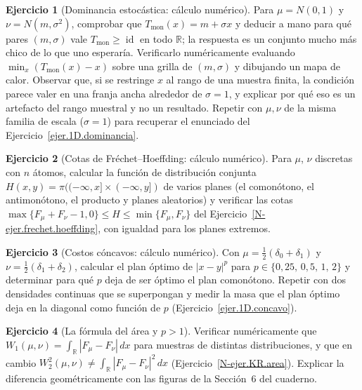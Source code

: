 \documentclass[11pt,a4paper]{amsart}
\newcounter{chapter}
\newcommand{\id}{\operatorname{id}}
\newcommand{\R}{{\mathbb R}}
\theoremstyle{remark}
\theoremstyle{definition}
\newtheorem{ejercicio}{Ejercicio}[chapter]
\numberwithin{subsection}{section}
\numberwithin{equation}{section}
\begin{document}
\begin{ejercicio}[Dominancia estocástica: cálculo numérico]\label{ejc.1D.dominancia}
Para $\mu=N(0,1)$ y $\nu=N(m,\sigma^2)$, comprobar que
$T_{\mathrm{mon}}(x)=m+\sigma x$ y deducir a mano para qué pares
$(m,\sigma)$ vale $T_{\mathrm{mon}}\ge\id$ en todo $\R$; la respuesta es un
conjunto mucho más chico de lo que uno esperaría. Verificarlo numéricamente
evaluando $\min_x(T_{\mathrm{mon}}(x)-x)$ sobre una grilla de $(m,\sigma)$ y
dibujando un mapa de calor. Observar que, si se restringe $x$ al rango de una
muestra finita, la condición parece valer en una franja ancha alrededor de
$\sigma=1$, y explicar por qué eso es un artefacto del rango muestral y no un
resultado. Repetir con $\mu,\nu$ de la misma familia de escala ($\sigma=1$)
para recuperar el enunciado del Ejercicio~\ref{ejer.1D.dominancia}.
\end{ejercicio}

\begin{ejercicio}[Cotas de Fréchet--Hoeffding: cálculo numérico]\label{ejc.1D.frechet}
Para $\mu$, $\nu$ discretas con $n$ átomos, calcular la función de
distribución conjunta $H(x,y)=\pi((-\infty,x]\times(-\infty,y])$ de varios
planes (el comonótono, el antimonótono, el producto y planes aleatorios) y
verificar las cotas $\max\{F_\mu+F_\nu-1,0\}\le H\le\min\{F_\mu,F_\nu\}$ del
Ejercicio~\ref{N-ejer.frechet.hoeffding}, con igualdad para los planes extremos.
\end{ejercicio}

\begin{ejercicio}[Costos cóncavos: cálculo numérico]\label{ejc.1D.concavos}
Con $\mu=\frac12(\delta_0+\delta_1)$ y $\nu=\frac12(\delta_1+\delta_2)$,
calcular el plan óptimo de $|x-y|^p$ para $p\in\{0{,}25,\,0{,}5,\,1,\,2\}$ y
determinar para qué $p$ deja de ser óptimo el plan comonótono. Repetir con dos
densidades continuas que se superpongan y medir la masa que el plan óptimo
deja en la diagonal como función de $p$ (Ejercicio~\ref{ejer.1D.concavo}).
\end{ejercicio}

\begin{ejercicio}[La fórmula del área y $p>1$]\label{ejc.1D.area}
Verificar numéricamente que $W_1(\mu,\nu)=\int_\R|F_\mu-F_\nu|\,dx$ para
muestras de distintas distribuciones, y que en cambio
$W_2^2(\mu,\nu)\ne\int_\R|F_\mu-F_\nu|^2\,dx$
(Ejercicio~\ref{N-ejer.KR.area}). Explicar la diferencia geométricamente con
las figuras de la Sección~6 del cuaderno.
\end{ejercicio}



\end{document}
